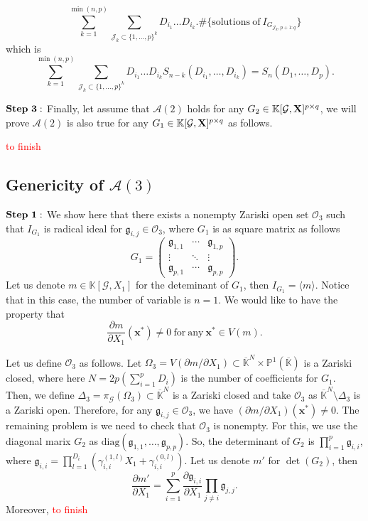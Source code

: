 \documentclass[11pt]{article}
\numberwithin{Property}{section}
\numberwithin{Theorem}{section}
\numberwithin{Proposition}{section}
\numberwithin{Lemma}{section}
\numberwithin{Corollary}{section}
\numberwithin{Definition}{section}
\numberwithin{Remark}{section}
\numberwithin{Conjecture}{section}
\numberwithin{Problem}{section}
\numberwithin{Example}{section}
\numberwithin{Claim}{section}
\def\bar{\overline}
\newcommand{\field}{\mathbb{K}} %
\newcommand{\mat}[1]{\mathbf{\MakeUppercase{#1}}} %
\newcommand{\todo}[1]{\textcolor{red}{#1}} %
\begin{document}
\[\sum_{k=1}^{\min(n,p)} \sum_{\mathcal{J}_k \subset\{1, \ldots, p\}^k}D_{i_1} \ldots D_{i_k} . \# \{\mathrm{solutions \ of \ } I_{G_{\mathcal{J}_k, p+1:q}}\}\] which is 
\[
\sum_{k=1}^{\min(n,p)} \sum_{\mathcal{J}_k \subset\{1, \ldots, p\}^k}D_{i_1} \ldots D_{i_k}S_{n-k}(D_{i_1}, \ldots, D_{i_k}) = S_n(D_1, \ldots, D_p). 
\]

$\bf{Step \ 3:}$ Finally, let assume that $\mathcal{A}(2)$ holds for any $G_2 \in \field[\mathcal{G}, \mat{X}]^{p \times q}$, we will prove $\mathcal{A}(2)$ is also true for any $G_1 \in \field[\mathcal{G}, \mat{X}]^{p \times q}$ as follows.

\todo{to finish}
\subsection{Genericity of $\mathcal{A}(3)$} $\bf{Step \ 1:}$ We show here that there exists a nonempty Zariski open set $\mathcal{O}_3$ such that $I_{G_1}$ is radical ideal for $\mathfrak{g}_{i,j} \in \mathcal{O}_3$, where $G_1$ is as square matrix as follows 
\[
G_1 = \left( \begin{matrix}
\mathfrak{g}_{1,1}  & \cdots  & \mathfrak{g}_{1, p}\\
\vdots & \ddots & \vdots \\
\mathfrak{g}_{p,1} & \cdots  & \mathfrak{g}_{p, p}
\end{matrix} \right).
\] Let us denote $m \in \field[\mathcal{G}, X_1]$ for the deteminant of $G_1$, then $I_{G_1} = \langle m \rangle$. Notice that in this case, the number of variable is $n = 1$. We would like to have the property that \[\frac{\partial m}{\partial X_1}(\mathbf{x}^*) \ne 0 \ \mathrm{for \ any} \ \mathbf{x}^* \in V(m). \] 

Let us define $\mathcal{O}_3$ as follows. Let $\Omega_3 = V(\partial m / \partial X_1) \subset \bar{\field}^N \times \mathbb{P}^1(\bar{\field})$ is a Zariski closed, where here $N = 2p(\sum_{i=1}^pD_i)$ is the number of coefficients for $G_1$. Then, we define $\Delta_3 = \pi_{\mathcal{G}}(\Omega_3) \subset \bar{\field}^{N}$ is a Zariski closed and take $\mathcal{O}_3$ as $\bar{\field}^{N} \setminus \Delta_3$ is a Zariski open. Therefore, for any $\mathfrak{g}_{i,j} \in \mathcal{O}_3$, we have $(\partial m / \partial X_1) (\mathbf{x}^*) \ne 0$. The remaining problem is we need to check that $\mathcal{O}_3$ is nonempty. For this, we use the diagonal marix $G_2$ as $\mathrm{diag}(\mathfrak{g}_{1,1}, \ldots, \mathfrak{g}_{p,p})$. So, the determinant of $G_2$ is $\prod_{i=1}^p\mathfrak{g}_{i,i}$, where $\mathfrak{g}_{i,i} = \prod_{l=1}^{D_i}(\gamma_{i,i}^{(1,l)}X_1 + \gamma_{i,i}^{(0,l)})$. Let us denote $m'$ for $\det(G_2)$, then 
\[
\frac{\partial m'}{\partial X_1} = \sum_{i = 1}^p\frac{\partial \mathfrak{g}_{i,i}}{\partial X_1}\prod_{j \ne i} \mathfrak{g}_{j,j}.
\]
Moreover, \todo{to finish}
\end{document}

